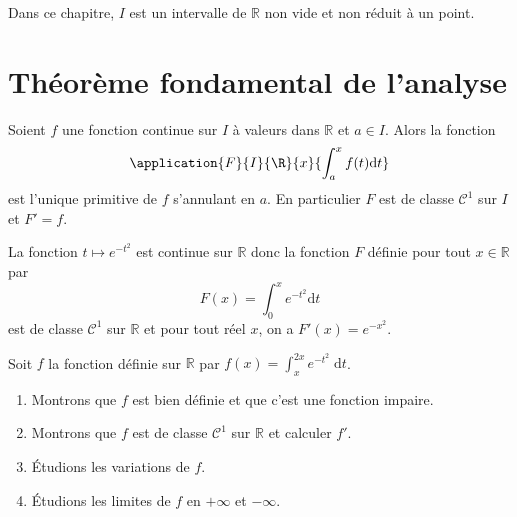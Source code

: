 \documentclass[french,11pt,twoside]{VcCours}
\newcommand{\dt}{\text{d}t}
\begin{document}

\tableofcontents
\separationTitre


Dans ce chapitre, $I$ est un intervalle de $\mathbb{R}$ non vide et non réduit à un point.
\section{Théorème fondamental de l'analyse}

\begin{Theoreme}{} Soient $f$ une fonction continue sur $I$ à valeurs dans $\mathbb{R}$ et $a \in I$. Alors la fonction 
$$\application{F}{I}{\R}{x}{\int_{a}^x f(t) \dt}$$
est l'unique primitive de $f$ s'annulant en $a$. En particulier $F$ est de classe $\mathcal{C}^1$ sur $I$ et $F'=f$.
\end{Theoreme} 

\begin{Exemple} La fonction $t \mapsto e^{-t^2}$ est continue sur $\mathbb{R}$ donc la fonction $F$ définie pour tout $x \in \mathbb{R}$ par 
$$ F(x) = \int_{0}^x e^{-t^2} \dt$$
est de classe $\mathcal{C}^1$ sur $\mathbb{R}$ et pour tout réel $x$, on a $F'(x)=e^{-x^2}$.
\end{Exemple}


\begin{Exemple} Soit $f$ la fonction définie sur $\mathbb{R}$ par $\displaystyle{f(x)=\int_x^{2x} e^{-t^2}\;\text{d}t}$.
\begin{enumerate}
\item Montrons que $f$ est bien définie et que c'est une fonction impaire.

\newpage
\vspace*{3cm}

\item Montrons que $f$ est de classe $\mathcal{C}^1$ sur $\mathbb{R}$ et calculer $f'$.

\vspace{5cm}

\item Étudions les variations de $f$.

\vspace{5cm}

\item Étudions les limites de $f$ en $+ \infty$ et $- \infty$.

\vspace{7cm}
\end{enumerate}
\end{Exemple}
\end{document}
